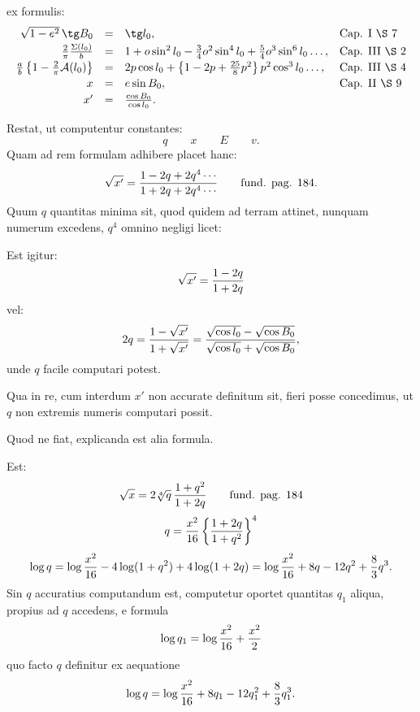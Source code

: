 \begingroup\small
ex formulis:
\[
\begin{array}{rcll}
 \sqrt{1-e^2}\,\tg B_0&=&\tg l_0, &\text{Cap. I \S\ 7}\vspace{0.2em}\\
 {2\over\pi}{\Sigma(l_0)\over b}&=&1+o\sin^2l_0-{3\over4}o^2\sin^4l_0+{5\over4}o^3\sin^6l_0\ldots, &\text{Cap. III \S\ 2}\vspace{0.2em}\\
 {a\over b}\left\{1-{2\over\pi}\mathcal A(l_0)\right\}&=&2p\cos l_0+\left\{1-2p+{25\over8}p^2\right\}p^2\cos^3l_0\ldots, &\text{Cap. III \S\ 4}\vspace{0.2em}\\
 x&=&e\sin B_0, &\text{Cap. II \S\ 9}\vspace{0.2em}\\
 x'&=&{\cos B_0\over \cos l_0}. &
\end{array}
\]


Restat, ut computentur constantes:
\[
 q\qquad x\qquad E\qquad v.
\]
Quam ad rem formulam adhibere placet hanc:
\[
 \sqrt{x'}={1-2q+2q^4\cdots\over 1+2q+2q^4\cdots}\qquad \text{fund. pag. 184.}
\]
Quum $q$ quantitas minima sit, quod quidem ad terram attinet, nunquam numerum  excedens, $q^4$ omnino negligi licet:

Est igitur:
\[
 \sqrt{x'}={1-2q\over 1+2q}
\]
vel:
\[
 2q={1-\sqrt{x'}\over 1+\sqrt{x'}}
 ={\sqrt{\cos l_0}-\sqrt{\cos B_0}\over \sqrt{\cos l_0}+\sqrt{\cos B_0}},
\]
unde $q$ facile computari potest.

Qua in re, cum interdum $x'$ non accurate definitum sit, fieri posse concedimus, ut $q$ non extremis numeris computari possit.

Quod ne fiat, explicanda est alia formula.

Est:
\[
 \sqrt{x}=2\sqrt[4]{q}\,{1+q^2\over 1+2q}
 \qquad \text{fund. pag. 184}
\]
\[
 q={x^2\over16}\left\{{1+2q\over 1+q^2}\right\}^{4}
\]
\[
 \log q=\log{x^2\over16}-4\log(1+q^2)+4\log(1+2q)
 =\log{x^2\over16}+8q-12q^2+{8\over3}q^3.
\]
Sin $q$ accuratius computandum est, computetur oportet quantitas $q_1$ aliqua, propius ad $q$ accedens, e formula
\[
 \log q_1=\log{x^2\over16}+{x^2\over2}
\]
quo facto $q$ definitur ex aequatione
\[
 \log q=\log{x^2\over16}+8q_1-12q_1^2+{8\over3}q_1^3.
\]
\endgroup
